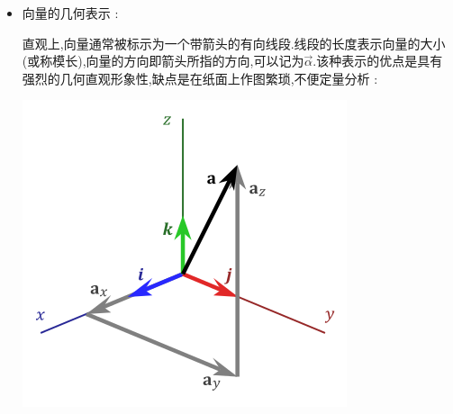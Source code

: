 {{{\begin{itemize}
{                    在矩阵运算中,向量更多的被写成类似于矩阵的列向量或者行向量.在线性代数中所指的向量默认为列向量.比如一个向量$\vec{\alpha} = (a,b,c)$,可写成 : $$
                        \vec{\alpha} = \begin{bmatrix}
                            \alpha_1 \\
                            \alpha_2 \\
                            \alpha_3 \\
                        \end{bmatrix}
                    $$
                    或者行向量的形式 : $$
                        \vec{\alpha} = \begin{bmatrix}
                            \alpha_1 & \alpha_2 & \alpha_3
                        \end{bmatrix}
                    $$

                    列向量和行向量都可以被视为矩阵.
                    }
              \item {
                    向量的几何表示 :

                    直观上,向量通常被标示为一个带箭头的有向线段.线段的长度表示向量的大小(或称模长),向量的方向即箭头所指的方向,可以记为$\vec{\alpha}$.该种表示的优点是具有强烈的几何直观形象性,缺点是在纸面上作图繁琐,不便定量分析 :

                    \begin{center}
                        \includegraphics[scale=0.5]{resources/Vector_picture.png}
                    \end{center}
                    }
          \end{itemize}
      }%

}}
